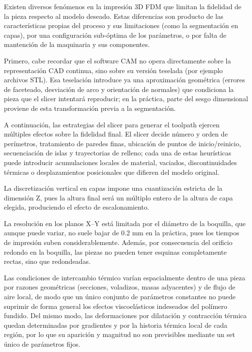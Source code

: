 Existen diversos fenómenos en la impresión 3D FDM que limitan la fidelidad de la pieza respecto al modelo deseado. Estas diferencias son producto de las características propias del proceso y sus limitaciones (como la segmentación en capas), por una configuración sub-óptima de los parámetros, o por falta de mantención de la maquinaria y sus componentes.

Primero, cabe recordar que el software CAM no opera directamente sobre la representación CAD continua, sino sobre su versión teselada (por ejemplo archivos STL). Esa teselación introduce ya una aproximación geométrica (errores de faceteado, desviación de arco y orientación de normales) que condiciona la pieza que el slicer intentará reproducir; en la práctica, parte del sesgo dimensional proviene de esta transformación previa a la segmentación.

A continuación, las estrategias del slicer para generar el toolpath ejercen múltiples efectos sobre la fidelidad final. El slicer decide número y orden de perímetros, tratamiento de paredes finas, ubicación de puntos de inicio/reinicio, secuenciación de islas y trayectorias de relleno; cada una de estas heurísticas puede introducir acumulaciones locales de material, vaciados, discontinuidades térmicas o desplazamientos posicionales que difieren del modelo original.

La discretización vertical en capas impone una cuantización estricta de la dimensión Z, pues la altura final será un múltiplo entero de la altura de capa elegida, produciendo el efecto de escalonamiento.

La resolución en los planos X–Y está limitada por el diámetro de la boquilla, que aunque puede variar, no suele bajar de 0.2 mm en la práctica, pues los tiempos de impresión suben considerablemente. Además, por consecuencia del orificio redondo en la boquilla, las piezas no pueden tener esquinas completamente rectas, sino que redondeadas.

Las condiciones de intercambio térmico varían espacialmente dentro de una pieza por razones geométricas (secciones, voladizos, masas adyacentes) y de flujo de aire local, de modo que un único conjunto de parámetros constantes no puede suprimir de forma general los efectos viscoelásticos indeseados del polímero fundido. Del mismo modo, las deformaciones por dilatación y contracción térmica quedan determinadas por gradientes y por la historia térmica local de cada región, por lo que su aparición y magnitud no son previsibles mediante un set único de parámetros fijos.

